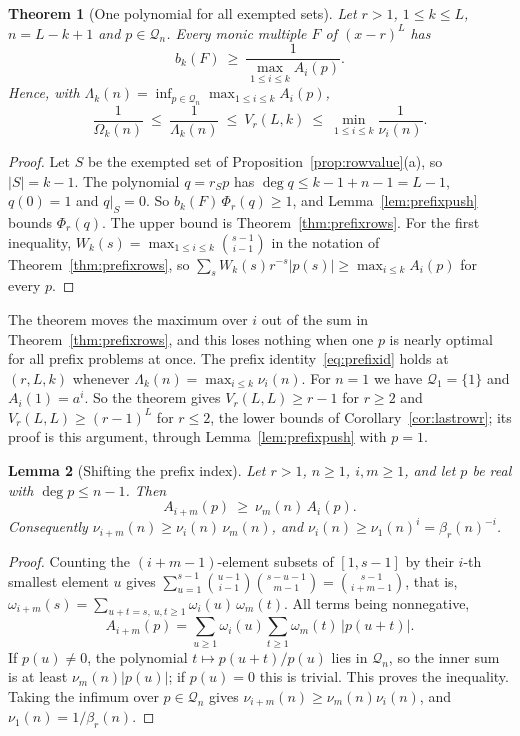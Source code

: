 \documentclass[11pt]{article}
\newtheorem{theorem}{Theorem}[section]
\newtheorem{lemma}[theorem]{Lemma}
\begin{document}
\begin{theorem}[One polynomial for all exempted sets]\label{thm:onepoly}
Let $r>1$, $1\le k\le L$, $n=L-k+1$ and $p\in\mathcal Q_n$.  Every monic
multiple $F$ of $(x-r)^L$ has
\[
  b_k(F)\ \ge\ \frac1{\max_{1\le i\le k}A_i(p)} .
\]
Hence, with $\Lambda_k(n)=\inf_{p\in\mathcal Q_n}\max_{1\le i\le k}A_i(p)$,
\[
  \frac1{\Omega_k(n)}\ \le\ \frac1{\Lambda_k(n)}\ \le\ V_r(L,k)\ \le\
  \min_{1\le i\le k}\frac1{\nu_i(n)} .
\]
\end{theorem}

\begin{proof}
Let $S$ be the exempted set of Proposition~\ref{prop:rowvalue}(a), so
$|S|=k-1$.  The polynomial $q=r_Sp$ has $\deg q\le k-1+n-1=L-1$, $q(0)=1$
and $q|_S=0$.  So $b_k(F)\,\Phi_r(q)\ge1$, and Lemma~\ref{lem:prefixpush}
bounds $\Phi_r(q)$.  The upper bound is Theorem~\ref{thm:prefixrows}.  For
the first inequality, $W_k(s)=\max_{1\le i\le k}\binom{s-1}{i-1}$ in the
notation of Theorem~\ref{thm:prefixrows}, so
$\sum_sW_k(s)r^{-s}|p(s)|\ge\max_{i\le k}A_i(p)$ for every $p$.
\end{proof}

The theorem moves the maximum over $i$ out of the sum in
Theorem~\ref{thm:prefixrows}, and this loses nothing when one $p$ is nearly
optimal for all prefix problems at once.  The prefix identity~\eqref{eq:prefixid} holds at $(r,L,k)$ whenever
$\Lambda_k(n)=\max_{i\le k}\nu_i(n)$.  For $n=1$ we have
$\mathcal Q_1=\{1\}$ and $A_i(1)=a^i$.  So the theorem gives
$V_r(L,L)\ge r-1$ for $r\ge2$ and $V_r(L,L)\ge(r-1)^L$ for $r\le2$, the
lower bounds of Corollary~\ref{cor:lastrowr}; its proof is this argument,
through Lemma~\ref{lem:prefixpush} with $p=1$.

\begin{lemma}[Shifting the prefix index]\label{lem:prefixshift}
Let $r>1$, $n\ge1$, $i,m\ge1$, and let $p$ be real with $\deg p\le n-1$.
Then
\[
  A_{i+m}(p)\ \ge\ \nu_m(n)\,A_i(p).
\]
Consequently $\nu_{i+m}(n)\ge\nu_i(n)\,\nu_m(n)$, and
$\nu_i(n)\ge\nu_1(n)^i=\beta_r(n)^{-i}$.
\end{lemma}

\begin{proof}
Counting the $(i+m-1)$-element subsets of $[1,s-1]$ by their $i$-th
smallest element $u$ gives
$\sum_{u=1}^{s-1}\binom{u-1}{i-1}\binom{s-u-1}{m-1}=\binom{s-1}{i+m-1}$, that is,
$\omega_{i+m}(s)=\sum_{u+t=s,\ u,t\ge1}\omega_i(u)\,\omega_m(t)$.  All terms
being nonnegative,
\[
  A_{i+m}(p)=\sum_{u\ge1}\omega_i(u)\sum_{t\ge1}\omega_m(t)\,|p(u+t)| .
\]
If $p(u)\ne0$, the polynomial $t\mapsto p(u+t)/p(u)$ lies in $\mathcal Q_n$,
so the inner sum is at least $\nu_m(n)|p(u)|$; if $p(u)=0$ this is trivial.
This proves the inequality.  Taking the infimum over $p\in\mathcal Q_n$
gives $\nu_{i+m}(n)\ge\nu_m(n)\nu_i(n)$, and $\nu_1(n)=1/\beta_r(n)$.
\end{proof}
\end{document}
